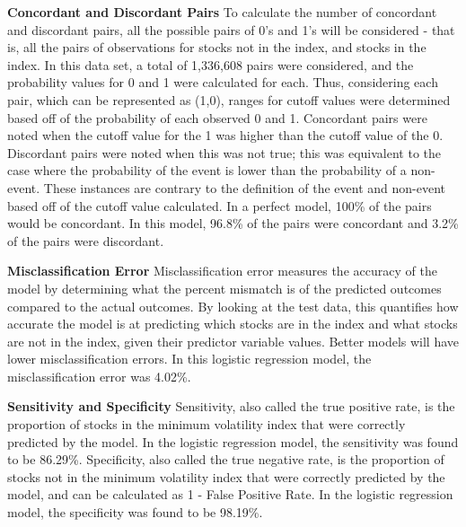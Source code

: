 \documentclass[12pt,twoside]{reedthesis}
\theoremstyle{definition}
\theoremstyle{definition}
\theoremstyle{definition}
\theoremstyle{remark}
\begin{document}
\hfill\break
\textbf{Concordant and Discordant Pairs} \hfill\break
To calculate the number of concordant and discordant pairs, all the
possible pairs of 0's and 1's will be considered - that is, all the
pairs of observations for stocks not in the index, and stocks in the
index. In this data set, a total of 1,336,608 pairs were considered, and
the probability values for 0 and 1 were calculated for each. Thus,
considering each pair, which can be represented as (1,0), ranges for
cutoff values were determined based off of the probability of each
observed 0 and 1. Concordant pairs were noted when the cutoff value for
the 1 was higher than the cutoff value of the 0. Discordant pairs were
noted when this was not true; this was equivalent to the case where the
probability of the event is lower than the probability of a non-event.
These instances are contrary to the definition of the event and
non-event based off of the cutoff value calculated. In a perfect model,
100\% of the pairs would be concordant. In this model, 96.8\% of the
pairs were concordant and 3.2\% of the pairs were discordant.

\hfill\break
\textbf{Misclassification Error} \hfill\break
Misclassification error measures the accuracy of the model by
determining what the percent mismatch is of the predicted outcomes
compared to the actual outcomes. By looking at the test data, this
quantifies how accurate the model is at predicting which stocks are in
the index and what stocks are not in the index, given their predictor
variable values. Better models will have lower misclassification errors.
In this logistic regression model, the misclassification error was
4.02\%.

\hfill\break
\textbf{Sensitivity and Specificity} \hfill\break
Sensitivity, also called the true positive rate, is the proportion of
stocks in the minimum volatility index that were correctly predicted by
the model. In the logistic regression model, the sensitivity was found
to be 86.29\%. Specificity, also called the true negative rate, is the
proportion of stocks not in the minimum volatility index that were
correctly predicted by the model, and can be calculated as 1 - False
Positive Rate. In the logistic regression model, the specificity was
found to be 98.19\%.
\end{document}
